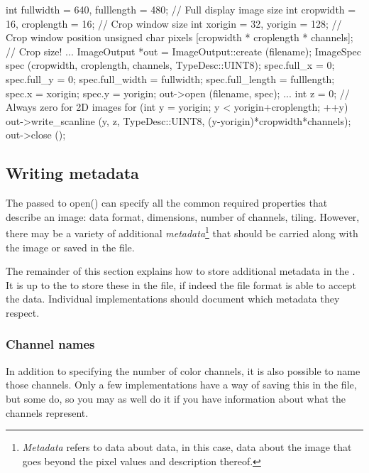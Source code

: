 \begin{code}
        int fullwidth = 640, fulllength = 480; // Full display image size
        int cropwidth = 16, croplength = 16;  // Crop window size
        int xorigin = 32, yorigin = 128;      // Crop window position
        unsigned char pixels [cropwidth * croplength * channels]; // Crop size!
        ...
        ImageOutput *out = ImageOutput::create (filename);
        ImageSpec spec (cropwidth, croplength, channels, TypeDesc::UINT8);
        spec.full_x = 0;
        spec.full_y = 0;
        spec.full_width = fullwidth;
        spec.full_length = fulllength;
        spec.x = xorigin;
        spec.y = yorigin;
        out->open (filename, spec);
        ...
        int z = 0;   // Always zero for 2D images
        for (int y = yorigin;  y < yorigin+croplength;  ++y) {
            out->write_scanline (y, z, TypeDesc::UINT8,
                                 (y-yorigin)*cropwidth*channels);
        }
        out->close ();
\end{code}


\subsection{Writing metadata}
\label{sec:imageoutput:metadata}

The \ImageSpec passed to {\cf open()} can specify all the common
required properties that describe an image: data format, dimensions,
number of channels, tiling.  However, there may be a variety of
additional \emph{metadata}\footnote{\emph{Metadata} refers to data about
data, in this case, data about the image that goes beyond the pixel
values and description thereof.} that should be carried along with the
image or saved in the file.  

The remainder of this section explains how to store additional metadata
in the \ImageSpec.  It is up to the \ImageOutput to store these
in the file, if indeed the file format is able to accept the data.
Individual \ImageOutput implementations should document which metadata
they respect.

\subsubsection{Channel names}

In addition to specifying the number of color channels, it is also
possible to name those channels.  Only a few \ImageOutput
implementations have a way of saving this in the file, but some do, so
you may as well do it if you have information about what the channels
represent.

